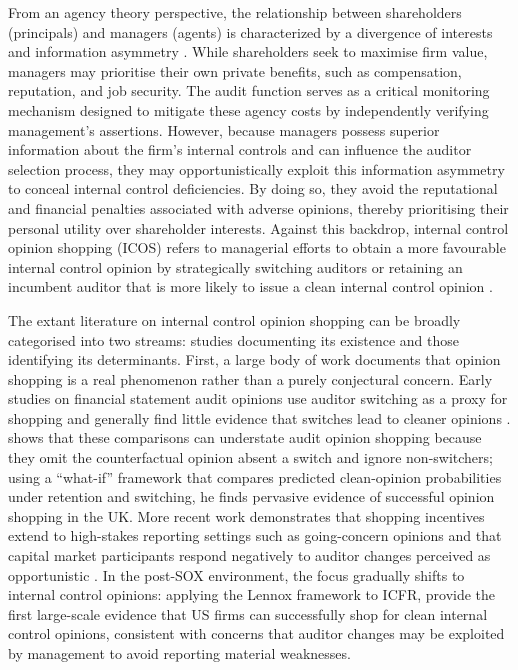 \documentclass[12pt, a4paper]{report}
\begin{document}
From an agency theory perspective, the relationship between shareholders (principals) and managers (agents) is characterized by a divergence of interests and information asymmetry \citep[e.g.,][]{jensenTheoryFirmManagerial2019}. While shareholders seek to maximise firm value, managers may prioritise their own private benefits, such as compensation, reputation, and job security. The audit function serves as a critical monitoring mechanism designed to mitigate these agency costs by independently verifying management's assertions. However, because managers possess superior information about the firm's internal controls and can influence the auditor selection process, they may opportunistically exploit this information asymmetry to conceal internal control deficiencies. By doing so, they avoid the reputational and financial penalties associated with adverse opinions, thereby prioritising their personal utility over shareholder interests. Against this backdrop, internal control opinion shopping (ICOS) refers to managerial efforts to obtain a more favourable internal control opinion by strategically switching auditors or retaining an incumbent auditor that is more likely to issue a clean internal control opinion \citep{lennoxCompaniesSuccessfullyEngage2000}.

The extant literature on internal control opinion shopping can be broadly categorised into two streams: studies documenting its existence and those identifying its determinants. First, a large body of work documents that opinion shopping is a real phenomenon rather than a purely conjectural concern. Early studies on financial statement audit opinions use auditor switching as a proxy for shopping and generally find little evidence that switches lead to cleaner opinions \citep{chowQualifiedAuditOpinions1982, smithAuditorSubjectOpinions1986, krishnanAuditorSwitchingConservatism1994}. \cite{lennoxCompaniesSuccessfullyEngage2000} shows that these comparisons can understate audit opinion shopping because they omit the counterfactual opinion absent a switch and ignore non-switchers; using a ``what-if'' framework that compares predicted clean-opinion probabilities under retention and switching, he finds pervasive evidence of successful opinion shopping in the UK. More recent work demonstrates that shopping incentives extend to high-stakes reporting settings such as going-concern opinions \citep{chungOpinionShoppingAvoid2019} and that capital market participants respond negatively to auditor changes perceived as opportunistic \citep{chungKoreanEvidenceAuditor2021}. In the post-SOX environment, the focus gradually shifts to internal control opinions: applying the Lennox framework to ICFR, \cite{newtonInternalControlOpinion2016} provide the first large-scale evidence that US firms can successfully shop for clean internal control opinions, consistent with concerns that auditor changes may be exploited by management to avoid reporting material weaknesses.
\end{document}
